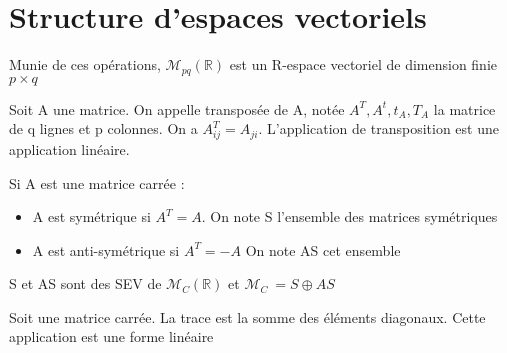 \documentclass[french]{yLectureNote}
\newcommand{\R}[0]{\mathbb{R}}
\newcommand{\mc}{\mathcal}
\begin{document}
\section{Structure d'espaces vectoriels}
\begin{proposition}
Munie de ces opérations, \(\mathcal{M}_{pq}(\R)\) est un R-espace vectoriel de dimension finie \(p\times q\)
\end{proposition}
\begin{definition}[Transposée]
Soit A une matrice. On appelle transposée de A, notée \(A^T, A^t, t_A,T_A\) la matrice de q lignes et p colonnes. On a \(A^T_{ij} = A_{ji}\). L'application de transposition est une application linéaire.
\end{definition}
%
\begin{definition}
Si A est une matrice carrée :
\begin{itemize}
 \item A est symétrique si \(A^T = A\). On note S l'ensemble des matrices symétriques
 \item  A est anti-symétrique si \(A^T = -A\) On note AS cet ensemble
\end{itemize}
S et AS sont des SEV de \(\mc{M}_C(\R)\) et \(\mc{M}_C\ = S\oplus AS\)
\end{definition}
\begin{definition}[Trace]
Soit une matrice carrée. La trace est la somme des éléments diagonaux. Cette application est une forme linéaire
\end{definition}
\end{document}
